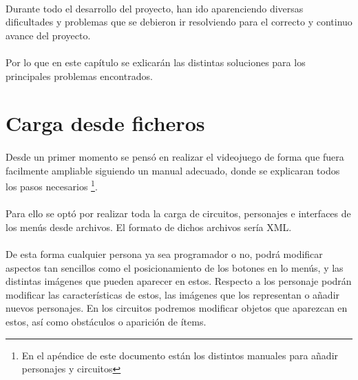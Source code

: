 \paragraph{}
Durante todo el desarrollo del proyecto, han ido aparenciendo diversas dificultades y problemas que se debieron ir
resolviendo para el correcto y continuo avance del proyecto.

\paragraph{}
Por lo que en este capítulo se exlicarán las distintas soluciones para los principales problemas encontrados. 


\section{Carga desde ficheros}

\paragraph{}
Desde un primer momento se pensó en realizar el videojuego de forma que fuera facilmente ampliable siguiendo un manual adecuado, 
donde se explicaran todos los pasos necesarios \footnote{En el apéndice de este documento están los distintos manuales para
añadir personajes y circuitos}.

\paragraph{}
Para ello se optó por realizar toda la carga de circuitos, personajes e interfaces de los menús desde archivos. El formato de 
dichos archivos sería XML.

\paragraph{}
De esta forma cualquier persona ya sea programador o no, podrá modificar aspectos tan sencillos como el posicionamiento de los 
botones en lo menús, y las distintas imágenes que pueden aparecer en estos. Respecto a los personaje podrán modificar las 
características de estos, las imágenes que los representan o añadir nuevos personajes. En los circuitos podremos modificar objetos
que aparezcan en estos, así como obstáculos o aparición de ítems.

